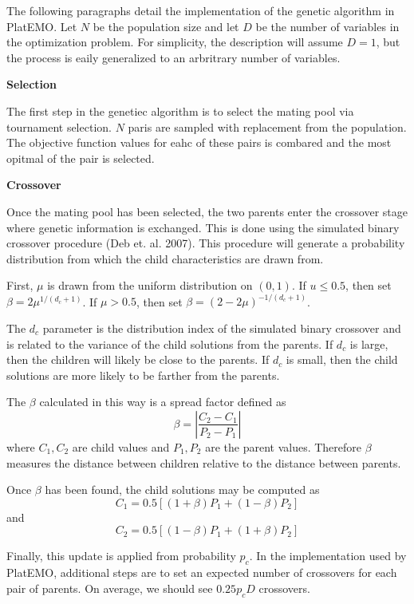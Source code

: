 \documentclass[11pt,a4paper]{article}
\begin{document}
The following paragraphs detail the implementation of the genetic algorithm in PlatEMO. Let $N$ be the population size and let $D$ be the number of variables in the optimization problem. For simplicity, the description will assume $D=1$, but the process is eaily generalized to an arbritrary number of variables.

\begin{flushleft}
\textbf{Selection}
\end{flushleft}
The first step in the genetiec algorithm is to select the mating pool via tournament selection. $N$ paris are sampled with replacement from the population. The objective function values for eahc of these pairs is combared and the most opitmal of the pair is selected.

\begin{flushleft}
\textbf{Crossover}
\end{flushleft}
Once the mating pool has been selected, the two parents enter the crossover stage where genetic information is exchanged. This is done using the simulated binary crossover procedure (Deb et. al. 2007). This procedure will generate a probability distribution from which the child characteristics are drawn from.

First, $\mu$ is drawn from the uniform distribution on $(0,1)$. If $u \leq 0.5$, then set $\beta = 2\mu^{1/(d_c+1)}$. If $\mu > 0.5$, then set $\beta = (2-2\mu)^{-1/(d_c+1)}$. 

The $d_c$ parameter is the distribution index of the simulated binary crossover and is related to the variance of the child solutions from the parents. If $d_c$ is large, then the children will likely be close to the parents.  If $d_c$ is small, then the child solutions are more likely to be farther from the parents.

The $\beta$ calculated in this way is a spread factor defined as 
$$
\beta = \left| \frac{C_2 - C_1}{P_2 - P_1} \right|
$$
where $C_1, C_2$ are child values and $P_1, P_2$ are the parent values. Therefore $\beta$ measures the distance between children relative to the distance between parents.

Once $\beta$ has been found, the child solutions may be computed as
$$
C_1 = 0.5\left[(1+\beta)P_1 + (1-\beta)P_2 \right]
$$
and 
$$
C_2 = 0.5\left[(1-\beta)P_1 + (1+\beta)P_2 \right]
$$

Finally, this update is applied from probability $p_c$. In the implementation used by PlatEMO, additional steps are to set an expected number of crossovers for each pair of parents. On average, we should see $0.25 p_cD$ crossovers.
\end{document}
